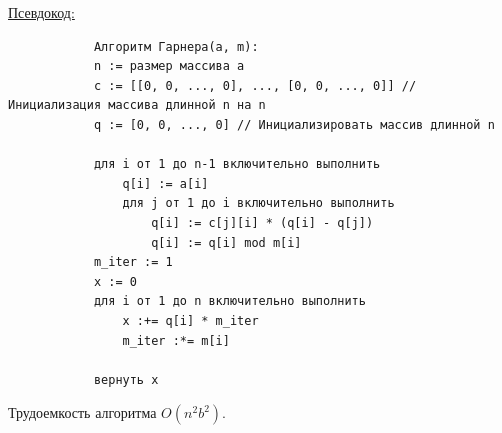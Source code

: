 \documentclass[bachelor, och, labwork]{SCWorks}
\begin{document}
            \underline{Псевдокод:}
            \begin{verbatim}
            Алгоритм Гарнера(a, m):
            n := размер массива a
            c := [[0, 0, ..., 0], ..., [0, 0, ..., 0]] // Инициализация массива длинной n на n
            q := [0, 0, ..., 0] // Инициализировать массив длинной n

            для i от 1 до n-1 включительно выполнить
                q[i] := a[i]
                для j от 1 до i включительно выполнить
                    q[i] := c[j][i] * (q[i] - q[j])
                    q[i] := q[i] mod m[i]
            m_iter := 1
            x := 0
            для i от 1 до n включительно выполнить
                x :+= q[i] * m_iter
                m_iter :*= m[i]
        
            вернуть x            
            \end{verbatim}


            Трудоемкость алгоритма $O(n^2 b^2)$.\\
\end{document}
